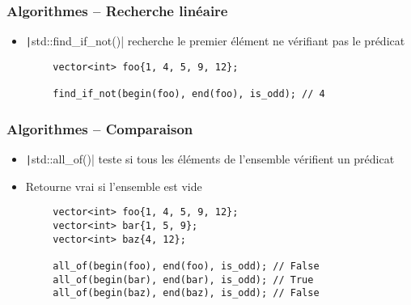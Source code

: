 \documentclass[C++.tex]{subfiles}
\begin{document}
\begin{frame}[fragile]
	\frametitle{Algorithmes -- Recherche linéaire}
	\begin{itemize}
		\item \texttt|std::find_if_not()| recherche le premier élément ne vérifiant pas le prédicat
	\end{itemize}

	\begin{verbatim}
		vector<int> foo{1, 4, 5, 9, 12};

		find_if_not(begin(foo), end(foo), is_odd); // 4
	\end{verbatim}

\end{frame}

\begin{frame}[fragile]
	\frametitle{Algorithmes -- Comparaison}
	\begin{itemize}
		\item \texttt|std::all_of()| teste si tous les éléments de l'ensemble vérifient un prédicat
		\item Retourne vrai si l'ensemble est vide
	\end{itemize}

	\begin{verbatim}
		vector<int> foo{1, 4, 5, 9, 12};
		vector<int> bar{1, 5, 9};
		vector<int> baz{4, 12};

		all_of(begin(foo), end(foo), is_odd); // False
		all_of(begin(bar), end(bar), is_odd); // True
		all_of(begin(baz), end(baz), is_odd); // False
	\end{verbatim}
\end{frame}
\end{document}
